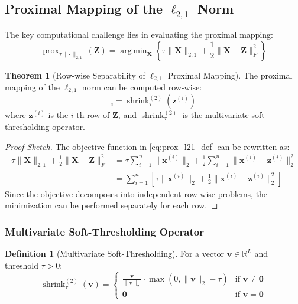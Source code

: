 \documentclass[12pt]{article}
\renewcommand{\vec}[1]{\mathbf{#1}}
\DeclareMathOperator{\argmin}{arg\,min}
\DeclareMathOperator{\prox}{prox}
\DeclareMathOperator{\shrink}{shrink}
\theoremstyle{definition}
\newtheorem{definition}{Definition}[section]
\newtheorem{theorem}{Theorem}[section]
\begin{document}
\subsection{Proximal Mapping of the $\ell_{2,1}$ Norm}

The key computational challenge lies in evaluating the proximal mapping:
\begin{equation}
    \prox_{\tau\|\cdot\|_{2,1}}(\vec{Z}) = \argmin_{\vec{X}} \left\{\tau\|\vec{X}\|_{2,1} + \frac{1}{2}\|\vec{X} - \vec{Z}\|_F^2\right\}
    \label{eq:prox_l21_def}
\end{equation}

\begin{theorem}[Row-wise Separability of $\ell_{2,1}$ Proximal Mapping]
    \label{thm:row_separability}
    The proximal mapping of the $\ell_{2,1}$ norm can be computed row-wise:
    \begin{equation}
        [\prox_{\tau\|\cdot\|_{2,1}}(\vec{Z})]_i = \shrink_{\tau}^{(2)}(\vec{z}^{(i)})
    \end{equation}
    where $\vec{z}^{(i)}$ is the $i$-th row of $\vec{Z}$, and $\shrink_{\tau}^{(2)}$ is the multivariate soft-thresholding operator.
\end{theorem}

\begin{proof}[Proof Sketch]
    The objective function in \eqref{eq:prox_l21_def} can be rewritten as:
    \begin{align}
        \tau\|\vec{X}\|_{2,1} + \frac{1}{2}\|\vec{X} - \vec{Z}\|_F^2 & = \tau\sum_{i=1}^{n}\|\vec{x}^{(i)}\|_2 + \frac{1}{2}\sum_{i=1}^{n}\|\vec{x}^{(i)} - \vec{z}^{(i)}\|_2^2 \\
                                                                     & = \sum_{i=1}^{n}\left[\tau\|\vec{x}^{(i)}\|_2 + \frac{1}{2}\|\vec{x}^{(i)} - \vec{z}^{(i)}\|_2^2\right]
    \end{align}
    Since the objective decomposes into independent row-wise problems, the minimization can be performed separately for each row.
\end{proof}

\subsubsection{Multivariate Soft-Thresholding Operator}

\begin{definition}[Multivariate Soft-Thresholding]
    \label{def:multi_soft_thresh}
    For a vector $\vec{v} \in \mathbb{R}^L$ and threshold $\tau > 0$:
    \begin{equation}
        \shrink_{\tau}^{(2)}(\vec{v}) = \begin{cases}
            \frac{\vec{v}}{\|\vec{v}\|_2} \cdot \max(0, \|\vec{v}\|_2 - \tau) & \text{if } \vec{v} \neq \vec{0} \\
            \vec{0}                                                           & \text{if } \vec{v} = \vec{0}
        \end{cases}
        \label{eq:multi_soft_thresh}
    \end{equation}
\end{definition}
\end{document}
